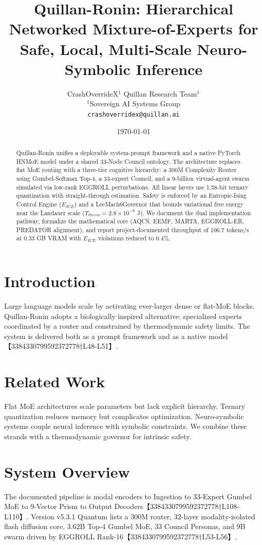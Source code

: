 \documentclass[11pt,a4paper,twocolumn]{article}
\title{\textbf{Quillan-Ronin: Hierarchical Networked Mixture-of-Experts for Safe, Local, Multi-Scale Neuro-Symbolic Inference}}
\author{CrashOverrideX$^{1}$ \quad Quillan Research Team$^{1}$ \\ \small $^{1}$Sovereign AI Systems Group \\ \small \texttt{crashoverridex@quillan.ai}}
\date{\today}
\begin{document}
\maketitle

\begin{abstract}
Quillan-Ronin unifies a deployable system-prompt framework and a native PyTorch HNMoE model under a shared 33-Node Council ontology. The architecture replaces flat MoE routing with a three-tier cognitive hierarchy: a 300M Complexity Router using Gumbel-Softmax Top-4, a 33-expert Council, and a 9-billion virtual-agent swarm simulated via low-rank EGGROLL perturbations. All linear layers use 1.58-bit ternary quantization with straight-through estimation. Safety is enforced by an Entropic-Ising Control Engine ($E_{ICE}$) and a LeeMach6Governor that bounds variational free energy near the Landauer scale ($T_{therm}=2.8\times10^{-8}$ J). We document the dual implementation pathway, formalize the mathematical core (AQCS, EEMF, MARTA, EGGROLL-ER, PREDATOR alignment), and report project-documented throughput of 106.7 tokens/s at 0.33 GB VRAM with $E_{ICE}$ violations reduced to 0.4\%.
\end{abstract}

\section{Introduction}
Large language models scale by activating ever-larger dense or flat-MoE blocks. Quillan-Ronin adopts a biologically inspired alternative: specialized experts coordinated by a router and constrained by thermodynamic safety limits. The system is delivered both as a prompt framework and as a native model【3384330799592372778†L48-L51】.

\section{Related Work}
Flat MoE architectures scale parameters but lack explicit hierarchy. Ternary quantization reduces memory but complicates optimization. Neuro-symbolic systems couple neural inference with symbolic constraints. We combine these strands with a thermodynamic governor for intrinsic safety.

\section{System Overview}
The documented pipeline is modal encoders to Ingestion to 33-Expert Gumbel MoE to 9-Vector Prism to Output Decoders【3384330799592372778†L108-L110】. Version v5.3.1 Quantum lists a 300M router, 32-layer modality-isolated flash diffusion core, 3.62B Top-4 Gumbel MoE, 33 Council Personas, and 9B swarm driven by EGGROLL Rank-16【3384330799592372778†L53-L56】.
\end{document}
